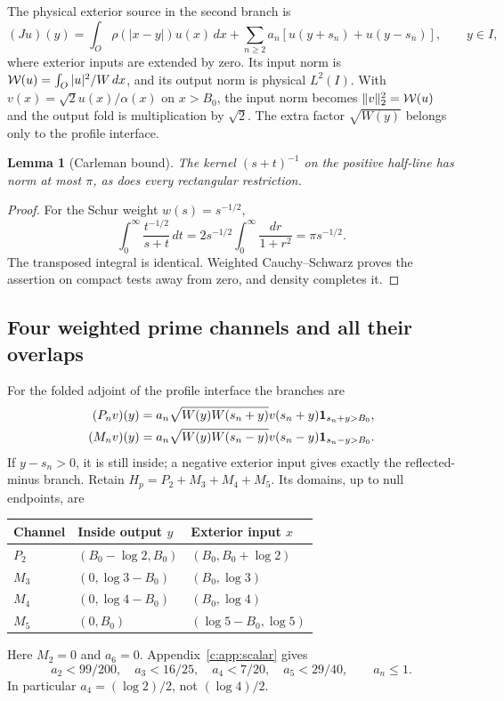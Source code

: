 \documentclass[11pt,a4paper]{article}
\numberwithin{equation}{section}
\newtheorem{lemma}[theorem]{Lemma}
\theoremstyle{definition}\newtheorem{definition}[theorem]{Definition}
\theoremstyle{remark}\newtheorem{remark}[theorem]{Remark}
\begin{document}
The physical exterior source in the second branch is
\begin{equation}\label{c:eq:physicalsource}
 (Ju)(y)=\int_O\rho(|x-y|)u(x)\,dx+
 \sum_{n\ge2}a_n[u(y+s_n)+u(y-s_n)],\qquad y\in I,
\end{equation}
where exterior inputs are extended by zero. Its input norm is
$\mathcal W(u)=\int_O|u|^2/W\,dx$, and its output norm is physical $L^2(I)$.
With $v(x)=\sqrt2u(x)/\alpha(x)$ on $x>{B_0}$, the input norm becomes $\lVert v\rVert_2^2=\mathcal W(u)$ and the output fold is multiplication by $\sqrt2$. The extra factor $\sqrt{W(y)}$ belongs only to the profile interface.

\begin{lemma}[Carleman bound]\label{c:lem:carleman}
The kernel $(s+t)^{-1}$ on the positive half-line has norm at most $\pi$, as does every rectangular restriction.
\end{lemma}
\begin{proof}
For the Schur weight $w(s)=s^{-1/2}$,
\[
 \int_0^\infty\frac{t^{-1/2}}{s+t}\,dt
 =2s^{-1/2}\int_0^\infty\frac{dr}{1+r^2}=\pi s^{-1/2}.
\]
The transposed integral is identical. Weighted Cauchy--Schwarz proves the assertion on compact tests away from zero, and density completes it.
\end{proof}

\subsection{Four weighted prime channels and all their overlaps}\label{c:sec:weightedprime}
For the folded adjoint of the profile interface the branches are
\begin{align*}
 (P_nv)(y)&=a_n\sqrt{W(y)W(s_n+y)}v(s_n+y)\mathbf1_{s_n+y>{B_0}},\\
 (M_nv)(y)&=a_n\sqrt{W(y)W(s_n-y)}v(s_n-y)\mathbf1_{s_n-y>{B_0}}.
\end{align*}
If $y-s_n>0$, it is still inside; a negative exterior input gives exactly the reflected-minus branch. Retain $H_p=P_2+M_3+M_4+M_5$. Its domains, up to null endpoints, are
\begin{center}\small
\begin{tabular}{@{}lll@{}}\toprule
Channel & Inside output $y$ & Exterior input $x$\\\midrule
$P_2$ & $({B_0}-\log2,{B_0})$ & $({B_0},{B_0}+\log2)$\\
$M_3$ & $(0,\log3-{B_0})$ & $({B_0},\log3)$\\
$M_4$ & $(0,\log4-{B_0})$ & $({B_0},\log4)$\\
$M_5$ & $(0,{B_0})$ & $(\log5-{B_0},\log5)$\\\bottomrule
\end{tabular}
\end{center}
Here $M_2=0$ and $a_6=0$. Appendix~\ref{c:app:scalar} gives
\begin{equation}\label{c:eq:coefficientcaps}
 a_2<99/200,\quad a_3<16/25,\quad a_4<7/20,\quad a_5<29/40,
 \qquad a_n\le1.
\end{equation}
In particular $a_4=(\log2)/2$, not $(\log4)/2$.
\end{document}
